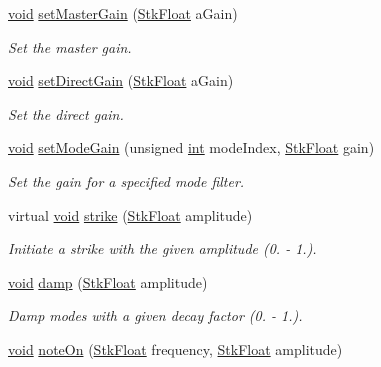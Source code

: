 \begin{DoxyCompactItemize}
\hyperlink{sound_8c_ae35f5844602719cf66324f4de2a658b3}{void} \hyperlink{class_nyq_1_1_modal_ab083513bb143c174f076e8c6e2ae28b5}{set\+Master\+Gain} (\hyperlink{namespace_nyq_a044fa20a706520a617bbbf458a7db7e4}{Stk\+Float} a\+Gain)
\begin{DoxyCompactList}\small\item\em Set the master gain. \end{DoxyCompactList}\item 
\hyperlink{sound_8c_ae35f5844602719cf66324f4de2a658b3}{void} \hyperlink{class_nyq_1_1_modal_a781daafc3a3c286232e589b80d6a7082}{set\+Direct\+Gain} (\hyperlink{namespace_nyq_a044fa20a706520a617bbbf458a7db7e4}{Stk\+Float} a\+Gain)
\begin{DoxyCompactList}\small\item\em Set the direct gain. \end{DoxyCompactList}\item 
\hyperlink{sound_8c_ae35f5844602719cf66324f4de2a658b3}{void} \hyperlink{class_nyq_1_1_modal_a0b08ebcb603e9eed18ab1f9950ae5968}{set\+Mode\+Gain} (unsigned \hyperlink{xmltok_8h_a5a0d4a5641ce434f1d23533f2b2e6653}{int} mode\+Index, \hyperlink{namespace_nyq_a044fa20a706520a617bbbf458a7db7e4}{Stk\+Float} gain)
\begin{DoxyCompactList}\small\item\em Set the gain for a specified mode filter. \end{DoxyCompactList}\item 
virtual \hyperlink{sound_8c_ae35f5844602719cf66324f4de2a658b3}{void} \hyperlink{class_nyq_1_1_modal_a9602ad88bfa9dc9ff53ef800f69bc8d6}{strike} (\hyperlink{namespace_nyq_a044fa20a706520a617bbbf458a7db7e4}{Stk\+Float} amplitude)
\begin{DoxyCompactList}\small\item\em Initiate a strike with the given amplitude (0. -\/ 1.). \end{DoxyCompactList}\item 
\hyperlink{sound_8c_ae35f5844602719cf66324f4de2a658b3}{void} \hyperlink{class_nyq_1_1_modal_a305f2d50d5927162e8de54ea5bb74f81}{damp} (\hyperlink{namespace_nyq_a044fa20a706520a617bbbf458a7db7e4}{Stk\+Float} amplitude)
\begin{DoxyCompactList}\small\item\em Damp modes with a given decay factor (0. -\/ 1.). \end{DoxyCompactList}\item 
\hyperlink{sound_8c_ae35f5844602719cf66324f4de2a658b3}{void} \hyperlink{class_nyq_1_1_modal_a7bb5150abe2510d9271053ccc754c3a6}{note\+On} (\hyperlink{namespace_nyq_a044fa20a706520a617bbbf458a7db7e4}{Stk\+Float} frequency, \hyperlink{namespace_nyq_a044fa20a706520a617bbbf458a7db7e4}{Stk\+Float} amplitude)

\end{DoxyCompactItemize}
